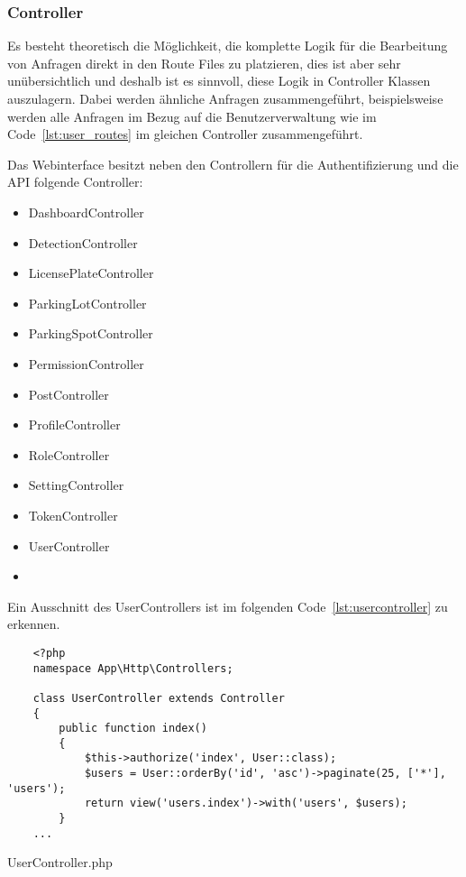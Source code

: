 \subsubsection{Controller}
Es besteht theoretisch die Möglichkeit, die komplette Logik für die Bearbeitung
von Anfragen direkt in den Route Files zu platzieren, dies ist aber sehr
unübersichtlich und deshalb ist es sinnvoll, diese Logik in Controller Klassen
auszulagern. Dabei werden ähnliche Anfragen zusammengeführt, beispielsweise werden
alle Anfragen im Bezug auf die Benutzerverwaltung wie im Code~\ref{lst:user_routes} im gleichen Controller
zusammengeführt.

Das Webinterface besitzt neben den Controllern für die Authentifizierung und die
API folgende Controller:

\begin{multicols}{2}
  \begin{itemize}
    \item DashboardController  \item DetectionController \item LicensePlateController \item ParkingLotController
    \item ParkingSpotController \item PermissionController \item PostController \item ProfileController
    \item RoleController \item SettingController \item TokenController \item UserController \item[\vspace{\fill}]
  \end{itemize}
\end{multicols}

Ein Ausschnitt des UserControllers ist im folgenden
Code~\ref{lst:usercontroller} zu erkennen.

\begin{listing}[H]
  \begin{verbatim}
    <?php
    namespace App\Http\Controllers;

    class UserController extends Controller
    {
        public function index()
        {
            $this->authorize('index', User::class);
            $users = User::orderBy('id', 'asc')->paginate(25, ['*'], 'users');
            return view('users.index')->with('users', $users);
        }
    ...
  \end{verbatim}
  \caption{UserController.php}
  \label{lst:usercontroller}
\end{listing}

